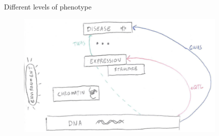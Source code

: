 \documentclass[aspectratio=169,12pt]{beamer}
\begin{document}
\begin{frame}{Different levels of phenotype}

	\begin{figure}
		\includegraphics[width=0.9\textwidth]{introduction/summary}
	\end{figure}

\end{frame}
\end{document}
